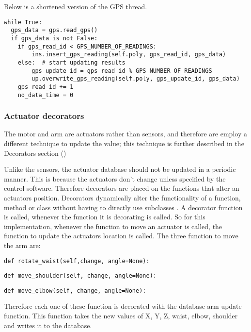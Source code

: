 
Below is a shortened version of the GPS thread.
\begin{lstlisting}[style=custompython]
while True:
  gps_data = gps.read_gps()
  if gps_data is not False:
    if gps_read_id < GPS_NUMBER_OF_READINGS:
   		ins.insert_gps_reading(self.poly, gps_read_id, gps_data)
    else:  # start updating results
   		gps_update_id = gps_read_id % GPS_NUMBER_OF_READINGS
    	up.overwrite_gps_reading(self.poly, gps_update_id, gps_data)
    gps_read_id += 1
    no_data_time = 0
\end{lstlisting}

\subsubsection{Actuator decorators}

The motor and arm are actuators rather than sensors, and therefore are employ a different technique to update the value; this technique is further described in the Decorators section (\cite{decoratordefinition})
 
Unlike the sensors, the actuator database should not be updated in a periodic manner. This is because the actuators don't change unless specified by the control software. Therefore decorators are placed on the functions that alter an actuators position.
\newline
Decorators dynamically alter the functionality of a function, method or class without having to directly use subclasses \cite{decoratordefinition}. A decorator function is called, whenever the function it is decorating is called. So for this implementation, whenever the function to move an actuator is called, the function to update the actuators location is called.
\newline
The three function to move the arm are:
\begin{lstlisting}[style=custompython]
def rotate_waist(self,change, angle=None):  
\end{lstlisting}
\begin{lstlisting}[style=custompython]
def move_shoulder(self, change, angle=None):  
\end{lstlisting}
\begin{lstlisting}[style=custompython]
def move_elbow(self, change, angle=None):  
\end{lstlisting}
Therefore each one of these function is decorated with the database arm update function. This function takes the new values of X, Y, Z, waist, elbow, shoulder and writes it to the database. 
\newline

